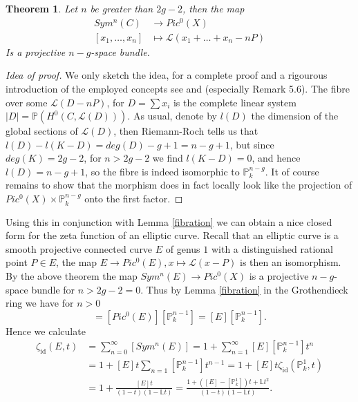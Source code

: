 \documentclass[11pt, a4paper, german, twoside]{article}
\theoremstyle{plain}
\newtheorem{theorem}{Theorem}[section]
\theoremstyle{definition}
\begin{document}
\begin{theorem}%
    Let $n$ be greater than $2g-2$, then the map  
    \begin{align*}
        Sym^n(C) &\to Pic^0(X) \\
        [x_1,\dots,x_n] &\mapsto \mathcal{L}(x_1 + \dots + x_n - nP)
    \end{align*}
    Is a projective $n-g$-space bundle.
\end{theorem}
\begin{proof}[Idea of proof]
    We only sketch the idea, for a complete proof and a rigourous introduction of the employed concepts see \cite{schwarzenberger1963}
    and \cite[Chap. III.5]{milneAV} (especially Remark 5.6).
    The fibre over some $\mathcal{L}(D - nP)$, for $D = \sum x_i$ is the complete linear system $|D| = \mathbb{P}(H^0(C, \mathcal{L}(D)))$.
    As usual, denote by $l(D)$ the dimension of the global sections of $\mathcal{L}(D)$, then Riemann-Roch tells us 
    that $l(D) - l(K-D) = deg(D) - g + 1 = n - g + 1$, but since $deg(K) = 2g-2$, for $n > 2g-2$ we find $l(K-D) = 0$, and hence
    $l(D) = n-g+1$, so the fibre is indeed isomorphic to $\mathbb{P}_k^{n-g}$. It of course remains to show that the morphism does in
    fact locally look like the projection of $Pic^0(X) \times \mathbb{P}_k^{n-g}$ onto the first factor.
\end{proof}

Using this in conjunction with Lemma \ref{fibration} we can obtain a nice closed form for the zeta function of an elliptic curve.
Recall that an elliptic curve is a smooth projective connected curve $E$ of genus $1$ with a distinguished rational point $P \in E$, the
map $E \to Pic^0(E), x \mapsto \mathcal{L}(x-P)$ is then an isomorphism. By the above theorem the map $Sym^n(E) \to Pic^0(X)$ is a projective $n-g$-space
bundle for
$n > 2g - 2 = 0$. 
Thus by Lemma \ref{fibration} in the Grothendieck ring we have for $n>0$ 
\begin{equation}
    [Sym^n(E)] = [Pic^0(E)][\mathbb{P}_k^{n-1}] = [E][\mathbb{P}_k^{n-1}].
\end{equation}
Hence we calculate
\begin{align*}
    \zeta_{\mathrm{id}}(E,t) &= \sum_{n=0}^{\infty} [Sym^n(E)] = 1 + \sum_{n=1}^\infty [E][\mathbb{P}_k^{n-1}]t^n \\
                             &= 1 + [E]t \sum_{n=1}[\mathbb{P}_k^{n-1}]t^{n-1} = 1 + [E]t \zeta_{\mathrm{id}}(\mathbb{P}_k^1, t)\\
                             &= 1 + \frac{[E]t}{(1-t)(1-\mathbb{L}t)} = \frac{1 + ([E]-[\mathbb{P}_k^1])t + \mathbb{L}t^2}{(1-t)(1-\mathbb{L}t)}.
\end{align*}
\end{document}
